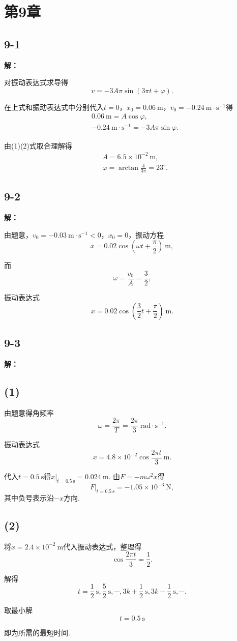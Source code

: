 \documentclass[twocolumn]{ctexart}
\newcommand{\sol}[1]{\subsection*{#1}\noindent\textbf{解：}
	
}
\begin{document}
\section*{第9章}
	
\sol{9-1}
对振动表达式求导得
$$v=-3A\pi\sin\left(3\pi t+\varphi\right).$$

在上式和振动表达式中分别代入$t=0$，$x_0=0.06\ \mathrm m$，$v_0=-0.24\ \mathrm m\cdot\mathrm s^{-1}$得
\begin{align}
	&0.06\ \mathrm m=A\cos\varphi,\\
	&-0.24\ \mathrm m\cdot\mathrm s^{-1}=-3A\pi\sin\varphi.
\end{align}

由(1)(2)式取合理解得
\begin{align*}
	&A=6.5\times10^{-2}\ \mathrm m,\\
	&\varphi=\arctan\frac{4}{3\pi}=23^\circ{}.
\end{align*}

\sol{9-2}
由题意，$v_0=-0.03\ \mathrm{m\cdot s^{-1}}<0$，$x_0=0$，振动方程
$$x=0.02\cos\left(\omega t+\frac{\pi}{2}\right)\ \mathrm m,$$

而
$$\omega=\frac{v_0}{A}=\frac{3}{2},$$

振动表达式
$$x=0.02\cos\left(\frac{3}{2}t+\frac{\pi}{2}\right)\ \mathrm m.$$

\sol{9-3}
\subsection*{(1)}
由题意得角频率
$$\omega=\frac{2\pi}{T}=\frac{2\pi}{3}\ \mathrm{rad\cdot s^{-1}}.$$

振动表达式
$$x=4.8\times10^{-2}\cos\frac{2\pi t}{3}\ \mathrm m.$$

代入$t=0.5\ \mathrm s$得$x|_{t=0.5\ \mathrm s}=0.024\ \mathrm m$. 由$F=-m\omega^2x$得
$$F|_{t=0.5\ \mathrm s}=-1.05\times10^{-3}\ \mathrm N,$$
其中负号表示沿$-x$方向.

\subsection*{(2)}
将$x=2.4\times10^{-2}\ \mathrm m$代入振动表达式，整理得
$$\cos\frac{2\pi t}{3}=\frac{1}{2}.$$

解得
$$t=\frac{1}{2}\ \mathrm s,\frac{5}{2}\ \mathrm s,\cdots,3k+\frac{1}{2}\ \mathrm s,3k-\frac{1}{2}\ \mathrm s,\cdots.$$

取最小解
$$t=0.5\ \mathrm s$$

即为所需的最短时间.
\end{document}
